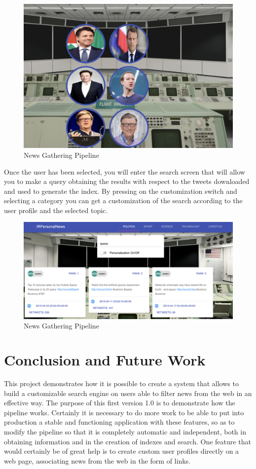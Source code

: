 \documentclass[11pt, english]{article}
\begin{document}
\begin{figure}[H]
  \includegraphics[width=16cm]{Resources/interface-intro.png}
  \caption{News Gathering Pipeline} 
\end{figure}

Once the user has been selected, you will enter the search screen that will allow you to make a query obtaining the results with respect to the tweets downloaded and used to generate the index.
By pressing on the customization switch and selecting a category you can get a customization of the search according to the user profile and the selected topic.

\begin{figure}[H]
  \includegraphics[width=16cm]{Resources/interface-search.png}
  \caption{News Gathering Pipeline} 
\end{figure}


\section{Conclusion and Future Work}

This project demonstrates how it is possible to create a system that allows to build a customizable search engine on users able to filter news from the web in an effective way.
\break
The purpose of this first version 1.0 is to demonstrate how the pipeline works.
\break
Certainly it is necessary to do more work to be able to put into production a stable and functioning application with these features, so as to modify the pipeline so that it is completely automatic and independent, both in obtaining information and in the creation of indexes and search.
\break
One feature that would certainly be of great help is to create custom user profiles directly on a web page, associating news from the web in the form of links.
\end{document}

